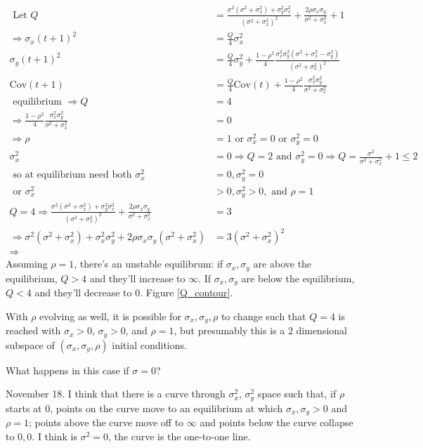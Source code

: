 \documentclass{article}
\newcommand{\Cov}{\text{Cov}}
\begin{document}
\begin{align*}
\text{ Let } Q&=\frac{\sigma^2(\sigma^2+\sigma_x^2)+\sigma_y^2\sigma_x^2}{(\sigma^2+\sigma_x^2)^2}+\frac{2\rho\sigma_x\sigma_y}{\sigma^2+\sigma_x^2}+1
\\ \Rightarrow \sigma_x(t+1)^2&=\frac{Q}{4}\sigma_x^2
\\ \sigma_y(t+1)^2&=\frac{Q}{4}\sigma_y^2+\frac{1-\rho^2}{4}\frac{\sigma_x^2\sigma_y^2(\sigma^2+\sigma_x^2-\sigma_y^2)}{(\sigma^2+\sigma_x^2)^2}
\\ \Cov(t+1)&=\frac{Q}{4}\Cov(t) +\frac{1-\rho^2}{4}\frac{\sigma_x^2\sigma_y^2}{\sigma^2+\sigma_x^2}
\\\text{ equilibrium } \Rightarrow Q & = 4 
\\ \Rightarrow \frac{1-\rho^2}{4}\frac{\sigma_x^2\sigma_y^2}{\sigma^2+\sigma_x^2} & = 0
\\ \Rightarrow \rho&=1 \text{ or }  \sigma_x^2=0 \text{ or } \sigma_y^2=0
\\ \sigma_x^2&=0 \Rightarrow Q = 2 \text{ and } \sigma_y^2=0 \Rightarrow Q = \frac{\sigma^2}{\sigma^2+\sigma_x^2}+1\leq 2
\\ \text{ so at equilibrium need both } \sigma_x^2&=0,\sigma_y^2=0 
\\ \text{ or } \sigma_x^2&>0,\sigma_y^2>0, \text{ and } \rho=1
\\ Q = 4 \Rightarrow \frac{\sigma^2(\sigma^2+\sigma_x^2)+\sigma_y^2\sigma_x^2}{(\sigma^2+\sigma_x^2)^2}+\frac{2\rho\sigma_x\sigma_y}{\sigma^2+\sigma_x^2} & = 3
\\ \Rightarrow \sigma^2(\sigma^2+\sigma_x^2)+\sigma_x^2\sigma_y^2+2\rho\sigma_x\sigma_y(\sigma^2+\sigma_x^2) & = 3(\sigma^2+\sigma_x^2)^2
\\ \Rightarrow 
\end{align*}
Assuming $\rho=1$, there's an unstable equilibrum: if $\sigma_x,\sigma_y$ are  above the equilibrium, $Q>4$ and they'll increase to $\infty$. If $\sigma_x,\sigma_y$ are below the equilibrium, $Q<4$ and they'll decrease to $0$. Figure \ref{Q_contour}.

With $\rho$ evolving as well, it is possible for $\sigma_x,\sigma_y,\rho$ to change such that $Q=4$ is reached with $\sigma_x>0$, $\sigma_y>0$, and $\rho=1$, but presumably this is a $2$ dimensional subspace of $(\sigma_x,\sigma_y,\rho)$ initial conditions.


What happens in this case if $\sigma=0$?

November 18. I think that there is a curve through $\sigma_x^2$, $\sigma_y^2$ space such that, if $\rho$ starts at $0$, points on the curve move to an equilibrium at which $\sigma_x,\sigma_y>0$ and $\rho=1$; points above the curve move off to $\infty$ and points below the curve collapse to $0,0$. I think is $\sigma^2=0$, the curve is the one-to-one line.
\end{document}
